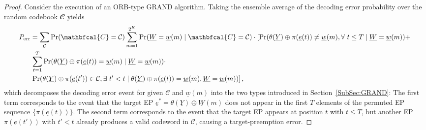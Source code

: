 \documentclass[letterpaper,draftclsnofoot,onecolumn]{IEEEtran}
\begin{document}
\begin{proof}\label{pf:prop:error_division} 
Consider the execution of an ORB-type GRAND algorithm.
Taking the ensemble average of the decoding error probability over the random codebook $\mathbfcal{C}$ yields
\begin{align}
    P_{\text{err}} & = \sum_{\mathcal{C}}\Pr(\mathbfcal{C} = \mathcal{C})\sum_{m=1}^{2^{K}}\Pr(\underline{W} = \underline{w}(m) \mid \mathbfcal{C} = \mathcal{C})\cdot \left[\Pr(\theta(\underline{Y})\oplus \pi(\underline{e}(t))\neq \underline{w}(m),\forall\ t \leq T \mid \underline{W} = \underline{w}(m)) + \right.  \notag \\
    & \left. \sum_{t=1}^{T}\Pr(\theta(\underline{Y})\oplus \pi(\underline{e}(t)) = \underline{w}(m) \mid \underline{W} = \underline{w}(m))\cdot \right. \notag\\
    & \left. \Pr(\theta(\underline{Y})\oplus \pi(\underline{e}(t'))\in \mathcal{C},\exists\ t'< t \mid \theta(\underline{Y})\oplus \pi(\underline{e}(t))=\underline{w}(m), \underline{W} = \underline{w}(m))\right], \label{eq:Long0.1}
\end{align}
which decomposes the decoding error event for given $\mathcal{C}$ and $\underline{w}(m)$ into the two types introduced in Section~\ref{SubSec:GRAND}: 
The first term corresponds to the event that the target EP $\underline{e}^*=\theta(\underline{Y})\oplus\underline{W}(m)$ does not appear in the first $T$ elements of the permuted EP sequence $\{\pi(\underline{e}(t))\}$.
The second term corresponds to the event that the target EP appears at position $t$ with $t\le T$, but another EP $\pi(\underline{e}(t'))$ with $t'<t$ already produces a valid codeword in $\mathcal{C}$, causing a target-preemption error.


\end{proof}
\end{document}
